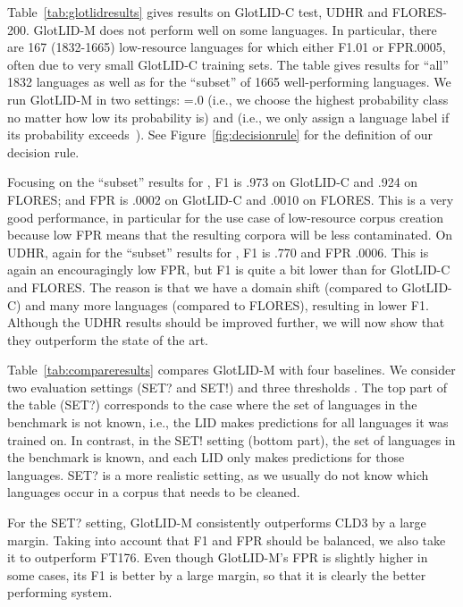 \documentclass[11pt]{article}
\newcommand{\basequ}{SET?\xspace}
\newcommand{\baseex}{SET!\xspace}
\def\numberlanguagesaccurate{1665\xspace}
\def\numberlanguagestotal{1832\xspace}
\def\numberlanguagediff{167\xspace}
\def\modelname{\mbox{GlotLID-M}\xspace}
\def\corpusname{\mbox{GlotLID-C}\xspace}
\def\flores{FLORES\xspace}
\def\udhr{UDHR\xspace}
\def\ft176{FT176\xspace}
\def\figref#1{Figure~\ref{fig:#1}}
\def\tabref#1{Table~\ref{tab:#1}}
\begin{document}
\tabref{glotlidresults} gives results on \corpusname test,
UDHR and FLORES-200.
\modelname does not perform well on some
languages. In particular, there are \numberlanguagediff
(\numberlanguagestotal-\numberlanguagesaccurate) low-resource languages
for which either F1.01 or FPR.0005, often due
to very small \corpusname training sets.
The table gives results for ``all'' \numberlanguagestotal languages as well as for
the ``subset'' of \numberlanguagesaccurate well-performing languages.
We run \modelname in two settings: =.0 (i.e.,
we choose the highest probability class no matter how low
its probability is) and  (i.e., we only assign a
language label if its probability
exceeds~). See \figref{decisionrule} for the
definition of our decision rule.

Focusing on the ``subset'' results for ,
F1 is .973 on \corpusname and .924 on \flores; and FPR is
.0002 on \corpusname and .0010 on \flores. This is a very good
performance, in particular for the use case of low-resource
corpus creation because low FPR means that the
resulting corpora will be less contaminated. 
 On \udhr, again for the ``subset'' results for , F1 is
.770 and FPR .0006. This is again an encouragingly low FPR,
but F1 is quite a bit lower than for \corpusname
and \flores. The reason is that we have a domain shift
(compared to \corpusname) and many more languages (compared
to \flores), resulting in lower F1. Although the \udhr
results should be improved further, we will now show that
they outperform the state of the art.


\tabref{compareresults} compares \modelname with four baselines.
We consider two evaluation settings
(\basequ and \baseex)
and three thresholds .
The top part of the table (\basequ) corresponds to the
case where the set  of languages in the benchmark is not known,
i.e., the LID makes predictions for all languages it was
trained on.
In contrast, in the
\baseex setting (bottom part), the set of languages in the
benchmark is known, and
each LID only makes predictions for those languages.
\basequ is a more realistic setting, as we usually do not know which
languages occur in a corpus that needs to be cleaned.

For the \basequ setting, \modelname consistently outperforms
CLD3 by a large margin. Taking into account that F1 and FPR
should be balanced, we also take it to outperform \ft176.
Even though \modelname's FPR is slightly higher in some
cases, its F1 is better by a large margin, so
that it is clearly the better performing system.
\end{document}
